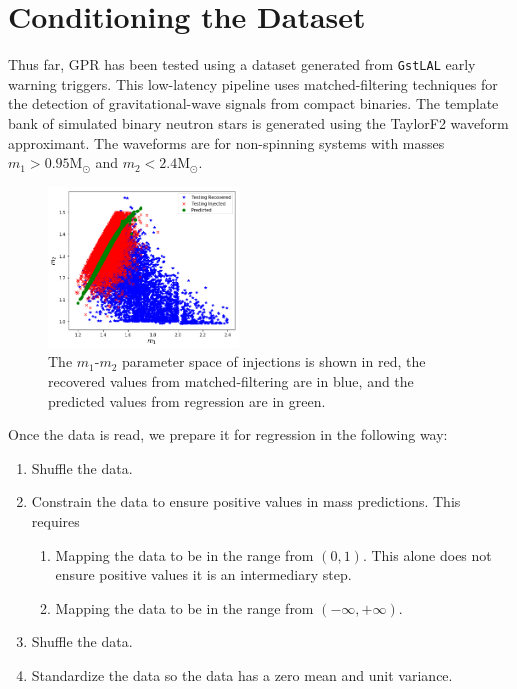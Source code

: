 \documentclass[aps,prd,twocolumn,superscriptaddress,preprintnumbers,floatfix,nofootinbib]{revtex4-2}
\begin{document}
\section{Conditioning the Dataset}
Thus far, GPR has been tested using a dataset generated from \texttt{GstLAL} 
early warning triggers. This low-latency pipeline uses matched-filtering techniques 
for the detection of gravitational-wave signals from compact binaries. 
The template bank of simulated binary neutron stars is generated using the 
TaylorF2 waveform approximant. The waveforms are for non-spinning systems 
with masses $m_1 > 0.95 \mathrm{M}_{\odot}$ and $m_2 < 2.4 \mathrm{M}_{\odot}$.

\begin{figure}[h]
  \centering
  \includegraphics[width=0.45\textwidth]{m1m2_comparison.png}
  \caption{The $m_1$-$m_2$ parameter space of injections is shown in red, the recovered
  		values from matched-filtering are in blue, and the predicted values from 
		regression are in green.}
\end{figure}

Once the data is read, we prepare it for regression in the following way:
\begin{enumerate}[label=(\roman*)]
	\item Shuffle the data.
	\item Constrain the data to ensure positive values in mass predictions. This requires
	\begin{enumerate}
		\item Mapping the data to be in the range from $(0,1)$. This alone does not
			ensure positive values it is an intermediary step. 
		\item Mapping the data to be in the range from $(-\infty,+\infty)$.
	 \end{enumerate}
	\item Shuffle the data.
	\item Standardize the data so the data has a zero mean and unit variance.
\end{enumerate}
\end{document}
